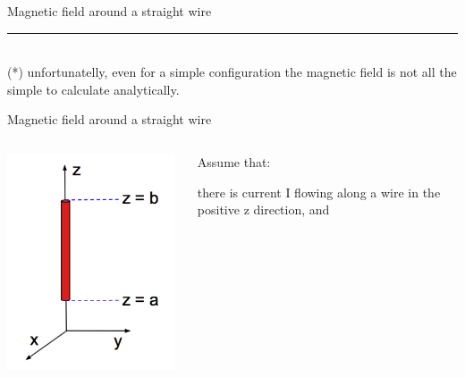 \begin{frame}{Magnetic field around a straight wire}
 \noindent\rule{2cm}{0.4pt}\\
 {\scriptsize
   (*) unfortunatelly, even for a simple configuration the magnetic field is not all the simple to calculate analytically.\\
 }

\end{frame}

%
%
%

\begin{frame}{Magnetic field around a straight wire}

\begin{columns}
  \begin{column}{0.40\textwidth}
    \includegraphics[width=0.98\textwidth]{./images/schematics/magnetic_field_around_wire_calc_01.png}
  \end{column}
  \begin{column}{0.60\textwidth}
  {\small
   Assume that:
   \begin{itemize}
   {\small
      \item there is current I flowing along a wire in the positive z direction, and
}
\end{itemize}}
\end{column}
\end{columns}
\end{frame}
